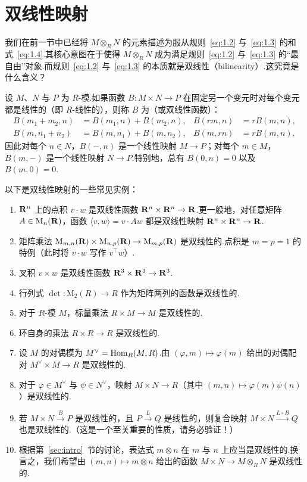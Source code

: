\section{双线性映射}
\label{sec:bilinear}

我们在前一节中已经将 $M \otimes_R N$ 的元素描述为服从规则~\eqref{eq:1.2} 与~\eqref{eq:1.3} 的和式~\eqref{eq:1.4}.其核心意图在于使得 $M \otimes_R N$ 成为满足规则~\eqref{eq:1.2} 与~\eqref{eq:1.3} 的``最自由''对象.而规则~\eqref{eq:1.2} 与~\eqref{eq:1.3} 的本质就是双线性（bilinearity）.这究竟是什么含义？

设 $M$、$N$ 与 $P$ 为 $R$-模.如果函数 $B \colon M \times N \to P$ 在固定另一个变元时对每个变元都是线性的（即 $R$-线性的），则称 $B$ 为（或双线性函数）：
\begin{align}
  B(m_1 + m_2, n) &= B(m_1, n) + B(m_2, n), & B(rm, n) &= rB(m, n), \label{eq:2.1} \\
  B(m, n_1 + n_2) &= B(m, n_1) + B(m, n_2), & B(m, rn) &= rB(m, n). \label{eq:2.2}
\end{align}
因此对每个 $n \in N$，$B(-, n)$ 是一个线性映射 $M \to P$；对每个 $m \in M$，$B(m, -)$ 是一个线性映射 $N \to P$.特别地，总有 $B(0, n) = 0$ 以及 $B(m, 0) = 0$.

以下是双线性映射的一些常见实例：
\begin{enumerate}
  \item $\mathbf{R}^n$ 上的点积 $v \cdot w$ 是双线性函数 $\mathbf{R}^n \times \mathbf{R}^n \to \mathbf{R}$.更一般地，对任意矩阵 $A \in \mathrm{M}_n(\mathbf{R})$，函数 $\langle v, w \rangle = v \cdot Aw$ 都是双线性映射 $\mathbf{R}^n \times \mathbf{R}^n \to \mathbf{R}$.
  \item 矩阵乘法 $\mathrm{M}_{m,n}(\mathbf{R}) \times \mathrm{M}_{n,p}(\mathbf{R}) \to \mathrm{M}_{m,p}(\mathbf{R})$ 是双线性的.点积是 $m = p = 1$ 的特例（此时将 $v \cdot w$ 写作 $v^\top w$）.
  \item 叉积 $v \times w$ 是双线性函数 $\mathbf{R}^3 \times \mathbf{R}^3 \to \mathbf{R}^3$.
  \item 行列式 $\det \colon \mathrm{M}_2(R) \to R$ 作为矩阵两列的函数是双线性的.
  \item 对于 $R$-模 $M$，标量乘法 $R \times M \to M$ 是双线性的.
  \item 环自身的乘法 $R \times R \to R$ 是双线性的.
  \item 设 $M$ 的对偶模为 $M^\vee = \operatorname{Hom}_R(M, R)$.由 $(\varphi, m) \mapsto \varphi(m)$ 给出的对偶配对 $M^\vee \times M \to R$ 是双线性的.
  \item 对于 $\varphi \in M^\vee$ 与 $\psi \in N^\vee$，映射 $M \times N \to R$（其中 $(m, n) \mapsto \varphi(m)\psi(n)$）是双线性的.
  \item 若 $M \times N \xrightarrow{B} P$ 是双线性的，且 $P \xrightarrow{L} Q$ 是线性的，则复合映射 $M \times N \xrightarrow{L \circ B} Q$ 也是双线性的.（这是一个至关重要的性质，请务必验证！）
  \item 根据第~\ref{sec:intro}~节的讨论，表达式 $m \otimes n$ 在 $m$ 与 $n$ 上应当是双线性的.换言之，我们希望由 $(m, n) \mapsto m \otimes n$ 给出的函数 $M \times N \to M \otimes_R N$ 是双线性的.
\end{enumerate}

